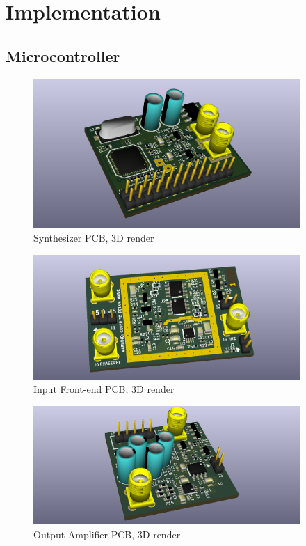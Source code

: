 \chapter{Implementation}

\section{Microcontroller}

\begin{figure}[H]
\centering
\includegraphics[width=4in]{synth3d.png}
\caption{Synthesizer PCB, 3D render}
\label{fig:synth3d}
\end{figure}

\begin{figure}[H]
\centering
\includegraphics[width=4in]{frontend3d.png}
\caption{Input Front-end PCB, 3D render}
\label{fig:front3d}
\end{figure}

\begin{figure}[H]
\centering
\includegraphics[width=4in]{outamp3d.png}
\caption{Output Amplifier PCB, 3D render}
\label{fig:outamp3d}
\end{figure}
